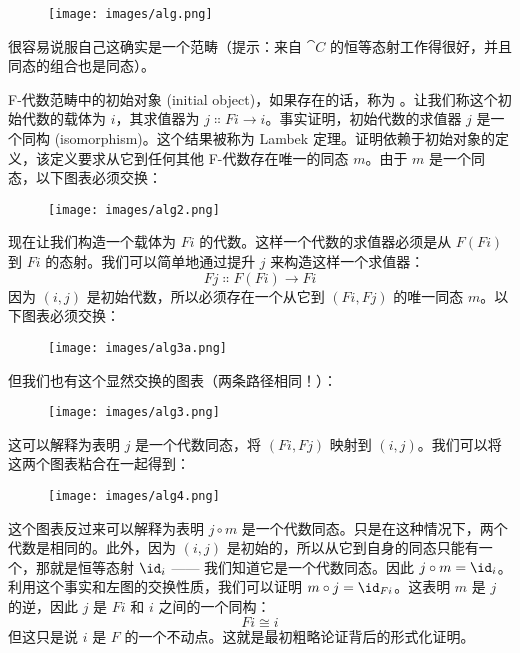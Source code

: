 \begin{figure}[H]
  \centering
  \texttt{[image: images/alg.png]}
\end{figure}

\noindent
很容易说服自己这确实是一个范畴（提示：来自 $\cat{C}$ 的恒等态射工作得很好，并且同态的组合也是同态）。

F-代数范畴中的初始对象 (initial object)，如果存在的话，称为 。让我们称这个初始代数的载体为 $i$，其求值器为 $j \Colon F i \to i$。事实证明，初始代数的求值器 $j$ 是一个同构 (isomorphism)。这个结果被称为 Lambek 定理。证明依赖于初始对象的定义，该定义要求从它到任何其他 F-代数存在唯一的同态 $m$。由于 $m$ 是一个同态，以下图表必须交换：

\begin{figure}[H]
  \centering
  \texttt{[image: images/alg2.png]}
\end{figure}

\noindent
现在让我们构造一个载体为 $F i$ 的代数。这样一个代数的求值器必须是从 $F (F i)$ 到 $F i$ 的态射。我们可以简单地通过提升 $j$ 来构造这样一个求值器：
\[F j \Colon F (F i) \to F i\]
因为 $(i, j)$ 是初始代数，所以必须存在一个从它到 $(F i, F j)$ 的唯一同态 $m$。以下图表必须交换：

\begin{figure}[H]
  \centering
  \texttt{[image: images/alg3a.png]}
\end{figure}

\noindent
但我们也有这个显然交换的图表（两条路径相同！）：

\begin{figure}[H]
  \centering
  \texttt{[image: images/alg3.png]}
\end{figure}

\noindent
这可以解释为表明 $j$ 是一个代数同态，将 $(F i, F j)$ 映射到 $(i, j)$。我们可以将这两个图表粘合在一起得到：

\begin{figure}[H]
  \centering
  \texttt{[image: images/alg4.png]}
\end{figure}

\noindent
这个图表反过来可以解释为表明 $j \circ m$ 是一个代数同态。只是在这种情况下，两个代数是相同的。此外，因为 $(i, j)$ 是初始的，所以从它到自身的同态只能有一个，那就是恒等态射 $\id_i$ —— 我们知道它是一个代数同态。因此 $j \circ m = \id_i$。利用这个事实和左图的交换性质，我们可以证明 $m \circ j = \id_{Fi}$。这表明 $m$ 是 $j$ 的逆，因此 $j$ 是 $F i$ 和 $i$ 之间的一个同构：
\[F i \cong i\]
但这只是说 $i$ 是 $F$ 的一个不动点。这就是最初粗略论证背后的形式化证明。

